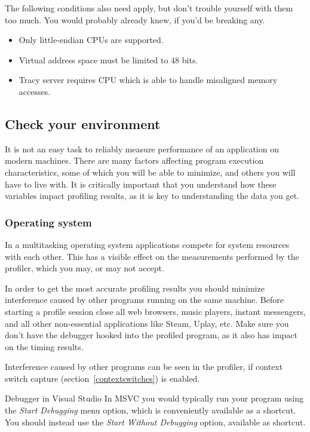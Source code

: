 \documentclass[hidelinks,titlepage,a4paper]{article}
\begin{document}
The following conditions also need apply, but don't trouble yourself with them too much. You would probably already knew, if you'd be breaking any.

\begin{itemize}
\item Only little-endian CPUs are supported.
\item Virtual address space must be limited to 48 bits.
\item Tracy server requires CPU which is able to handle misaligned memory accesses.
\end{itemize}

\subsection{Check your environment}

It is not an easy task to reliably measure performance of an application on modern machines. There are many factors affecting program execution characteristics, some of which you will be able to minimize, and others you will have to live with. It is critically important that you understand how these variables impact profiling results, as it is key to understanding the data you get.

\subsubsection{Operating system}
\label{checkenvironmentos}

In a multitasking operating system applications compete for system resources with each other. This has a visible effect on the measurements performed by the profiler, which you may, or may not accept.

In order to get the most accurate profiling results you should minimize interference caused by other programs running on the same machine. Before starting a profile session close all web browsers, music players, instant messengers, and all other non-essential applications like Steam, Uplay, etc. Make sure you don't have the debugger hooked into the profiled program, as it also has impact on the timing results.

Interference caused by other programs can be seen in the profiler, if context switch capture (section~\ref{contextswitches}) is enabled.

\begin{bclogo}[
noborder=true,
couleur=black!5,
logo=\bclampe
]{Debugger in Visual Studio}
In MSVC you would typically run your program using the \emph{Start Debugging} menu option, which is conveniently available as a  shortcut. You should instead use the \emph{Start Without Debugging} option, available as  shortcut.
\end{bclogo}
\end{document}
